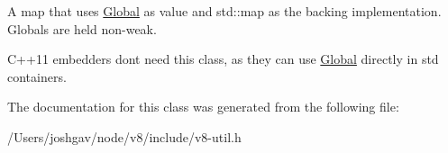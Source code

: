 A map that uses \hyperlink{classv8_1_1_global}{Global} as value and std\+::map as the backing implementation. Globals are held non-\/weak.

C++11 embedders don\textquotesingle{}t need this class, as they can use \hyperlink{classv8_1_1_global}{Global} directly in std containers. 

The documentation for this class was generated from the following file\+:\begin{DoxyCompactItemize}
\item 
/\+Users/joshgav/node/v8/include/v8-\/util.\+h\end{DoxyCompactItemize}
